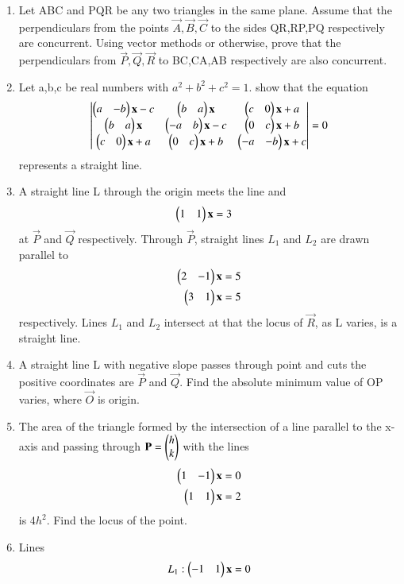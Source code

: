 \begin{enumerate}[label=\arabic*.,ref=\thesubsection.\theenumi]
    \item Let ABC and PQR be any two triangles in the same plane. Assume that the perpendiculars from the points $\vec{A},\vec{B},\vec{C}$ to the sides QR,RP,PQ respectively are concurrent. Using vector methods or otherwise, prove that the perpendiculars from $\vec{P},\vec{Q},\vec{R}$ to BC,CA,AB respectively are also concurrent.
    \item Let a,b,c be real numbers with $a^2+b^2+c^2=1$. show that the equation
    \begin{align}\begin{vmatrix}\begin{pmatrix}a & -b\end{pmatrix}\mathbf {x} - c & \begin{pmatrix}b & a\end{pmatrix}\mathbf {x} & \begin{pmatrix}c & 0\end{pmatrix}\mathbf {x} + a \\ \begin{pmatrix}b & a\end{pmatrix}\mathbf {x} &  \begin{pmatrix}-a & b\end{pmatrix}\mathbf {x} - c & \begin{pmatrix}0 & c\end{pmatrix}\mathbf {x} + b \\ \begin{pmatrix}c & 0\end{pmatrix}\mathbf {x} + a & \begin{pmatrix}0 & c\end{pmatrix}\mathbf {x} + b & \begin{pmatrix}-a & -b\end{pmatrix}\mathbf {x} + c\end{vmatrix} = 0 \end{align} represents a straight line.
    \item A straight line L through the origin meets the line and \begin{align}\begin{pmatrix}1 & 1\end{pmatrix} \mathbf {x} &= 3 \end{align} at $\vec{P}$ and $\vec{Q}$ respectively. Through $\vec{P}$,  straight lines $L_1$ and $L_2$ are drawn parallel to \begin{align}\begin{pmatrix}2 & -1\end{pmatrix} \mathbf {x} &= 5 \\ \begin{pmatrix}3 & 1\end{pmatrix} \mathbf {x}  &= 5 \end{align} respectively. Lines $L_1$ and $L_2$ intersect at that the locus of $\vec{R}$, as L varies, is a straight line.
    \item A straight line L with negative slope passes through point  and cuts the positive coordinates are $\vec{P}$ and $\vec{Q}$. Find the absolute minimum value of OP varies, where $\vec{O}$ is origin.
    \item The area of the triangle formed by the intersection of a line parallel to the x-axis and passing through $\mathbf{P}= \begin{pmatrix}h\\k\end{pmatrix}$ with the lines 
\begin{align}
\begin{pmatrix}1 & -1\end{pmatrix} \mathbf {x} &= 0 
\\
\begin{pmatrix}1 & 1\end{pmatrix} \mathbf {x} &= 2 
\end{align} is 4$h^2$. Find the locus of the point.
    \item Lines 
\begin{align}L_1: \myvec{-1 & 1} \vec {x} &=0
\\

\end{align}
\end{enumerate}

